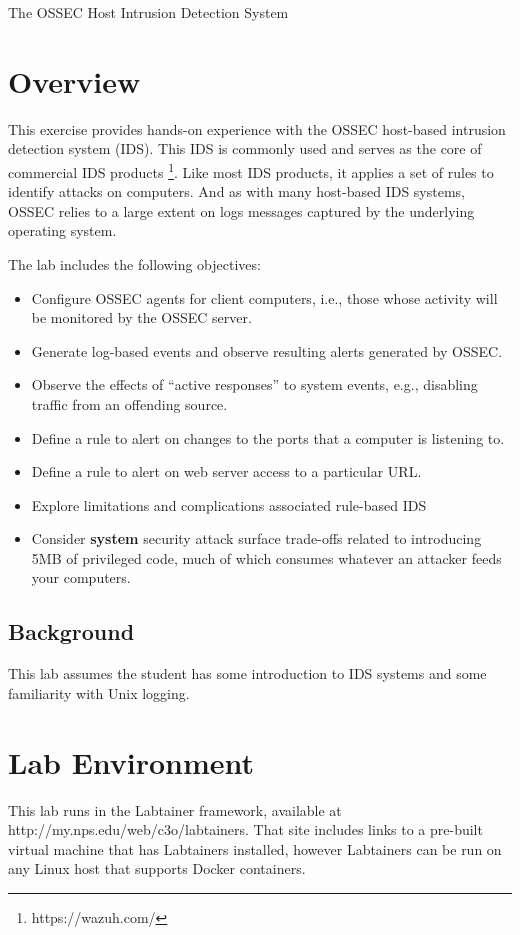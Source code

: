 


\begin{center}
{\LARGE The OSSEC Host Intrusion Detection System}
\vspace{0.1in}\\
\end{center}


\section{Overview}
This exercise provides hands-on experience with the OSSEC
host-based intrusion detection system (IDS).  This IDS is commonly used and serves as the core of commercial IDS products
\footnote{https://wazuh.com/}.  Like most IDS products, it applies a set of rules to identify attacks on computers.
And as with many host-based IDS systems, OSSEC relies to a large extent on 
logs messages captured by the underlying operating system.

The lab includes the following objectives:
\begin{itemize}
\item Configure OSSEC agents for client computers, i.e., those whose activity will be monitored by the OSSEC server.
\item Generate log-based events and observe resulting alerts generated by OSSEC.
\item Observe the effects of ``active responses'' to system events, e.g., disabling traffic from an offending source.
\item Define a rule to alert on changes to the ports that a computer is listening to.
\item Define a rule to alert on web server access to a particular URL.
\item Explore limitations and complications associated rule-based IDS
\item Consider \textbf{system} security attack surface trade-offs related to introducing 5MB of privileged code, much of which 
consumes whatever an attacker feeds your computers.
\end{itemize}

\subsection{Background}
This lab assumes the student has some introduction to IDS systems and
some familiarity with Unix logging.

\section{Lab Environment}
This lab runs in the Labtainer framework,
available at http://my.nps.edu/web/c3o/labtainers.
That site includes links to a pre-built virtual machine
that has Labtainers installed, however Labtainers can
be run on any Linux host that supports Docker containers.

